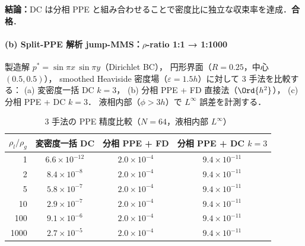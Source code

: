 \noindent\textbf{結論：}DC は分相 PPE と組み合わせることで密度比に独立な収束率を達成．\textbf{合格}．

\paragraph{(b) Split-PPE 解析 jump-MMS：$\rho$-ratio 1:1 → 1:1000}
\label{sec:verify_split_ppe_dc}
\label{sec:split_ppe_recovery}%
\label{sec:gfm_ppe_recovery}%

製造解 $p^* = \sin\pi x\,\sin\pi y$（Dirichlet BC），
円形界面（$R = 0.25$，中心 $(0.5, 0.5)$），
smoothed Heaviside 密度場（$\varepsilon = 1.5h$）に対して
3 手法を比較する：
(a) 変密度一括 DC $k = 3$，
(b) 分相 PPE + FD 直接法（$\Ord{h^2}$），
(c) 分相 PPE + DC $k = 3$．
液相内部（$\phi > 3h$）で $L^\infty$ 誤差を計測する．

\begin{table}[htbp]
\centering
\caption{3 手法の PPE 精度比較（$N = 64$，液相内部 $L^\infty$）}
\label{tab:split_ppe_dc_sweep}
\renewcommand{\arraystretch}{1.2}
\footnotesize
\begin{tabular}{rccc}
\toprule
$\rho_l/\rho_g$ & 変密度一括 DC & 分相 PPE + FD & 分相 PPE + DC $k{=}3$ \\
\midrule
   1 & $6.6 \times 10^{-12}$  & $2.0 \times 10^{-4}$ & $9.4 \times 10^{-11}$ \\
   2 & $8.4 \times 10^{-8}$   & $2.0 \times 10^{-4}$ & $9.4 \times 10^{-11}$ \\
   5 & $5.8 \times 10^{-7}$   & $2.0 \times 10^{-4}$ & $9.4 \times 10^{-11}$ \\
  10 & $2.9 \times 10^{-7}$   & $2.0 \times 10^{-4}$ & $9.4 \times 10^{-11}$ \\
 100 & $9.1 \times 10^{-6}$   & $2.0 \times 10^{-4}$ & $9.4 \times 10^{-11}$ \\
1000 & $2.7 \times 10^{-5}$   & $2.0 \times 10^{-4}$ & $9.4 \times 10^{-11}$ \\
\bottomrule
\end{tabular}
\end{table}

